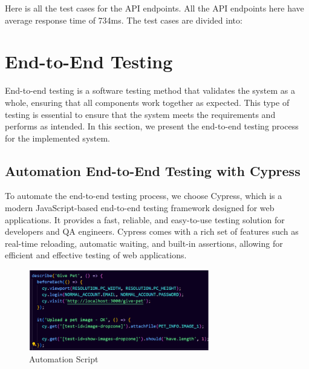 Here is all the test cases for the API endpoints. All the API endpoints
here have average response time of 734ms. The test cases are divided into:






















\section{End-to-End Testing}

End-to-end testing is a software testing method that validates the system as a whole, ensuring that all components work together as expected. This type of testing is essential to ensure that the system meets the requirements and performs as intended. In this section, we present the end-to-end testing process for the implemented system.

\subsection{Automation End-to-End Testing with Cypress}

To automate the end-to-end testing process, we choose Cypress, which is a modern JavaScript-based end-to-end testing framework designed for web applications. It provides a fast, reliable, and easy-to-use testing solution for developers and QA engineers. Cypress comes with a rich set of features such as real-time reloading, automatic waiting, and built-in assertions,  allowing for efficient and effective testing of web applications.

\begin{figure}[H]
    \centering
    \includegraphics[width=0.7\textwidth]{Figures/cypress_script.png}
    \caption{Automation Script}
    \label{fig:cypress-script}
\end{figure}


